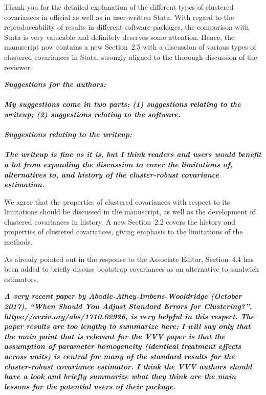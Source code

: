 \documentclass[10pt,a4paper]{article}
\begin{document}
\medskip

Thank you for the detailed explanation of the different types of clustered covariances in official as well as in user-written Stata.
With regard to the reproduceability of results in different software packages, the comparison with Stata is very valueable and definitely deserves some attention.
Hence, the manuscript now contains a new Section~2.5 with a discussion of various types of clustered covariances in Stata, strongly aligned to the thorough discussion of the reviewer.

\medskip

\textbf{\textit{Suggestions for the authors:
\\ \\
My suggestions come in two parts: (1) suggestions relating to the writeup; (2) suggestions relating to the software.
\\ \\
Suggestions relating to the writeup:
\\ \\
The writeup is fine as it is, but I think readers and users would benefit a lot from expanding the discussion to cover the limitations of, alternatives to, and history of the cluster-robust covariance estimation.
}}

\medskip

We agree that the properties of clustered covariances with respect to its limitations should be discussed in the manuscript, as well as the development of clustered covariances in history.
A new Section~2.2 covers the history and properties of clustered covariances, giving emphasis to the limitations of the methods.

As already pointed out in the response to the Associate Editor, Section~4.4 has been added to
briefly discuss bootstrap covariances as an alternative to sandwich estimators. 

\medskip

\textbf{\textit{A very recent paper by Abadie-Athey-Imbens-Wooldridge (October 2017), ``When Should You Adjust Standard Errors for Clustering?'', https://arxiv.org/abs/1710.02926, is very helpful in this respect.  The paper results are too lengthy to summarize here; I will say only that the main point that is relevant for the VVV paper is that the assumption of parameter homogeneity (identical treatment effects across units) is central for many of the standard results for the cluster-robust covariance estimator.  I think the VVV authors should have a look and briefly summarize what they think are the main lessons for the potential users of their package.
}}
\end{document}
